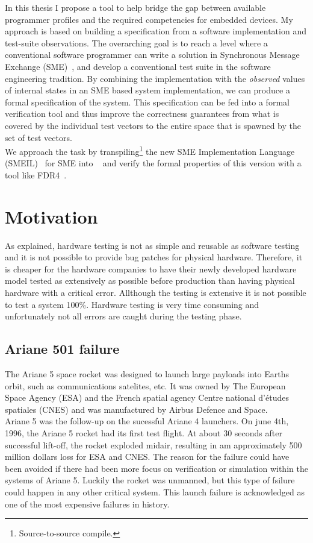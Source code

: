 In this thesis I propose a tool to help bridge the gap between available programmer profiles and the required competencies for embedded devices. My approach is based on building a specification from a software implementation and test-suite observations. The overarching goal is to reach a level where a conventional software programmer can write a solution in Synchronous Message Exchange (SME)~\cite{Vinter2014, Vinter2015, Skovhede}, and develop a conventional test suite in the software engineering tradition. By combining the implementation with the \emph{observed} values of internal states in an SME based system implementation, we can produce a formal specification of the system. This specification can be fed into a formal verification tool and thus improve the correctness guarantees from what is covered by the individual test vectors to the entire space that is spawned by the set of test vectors.\\

We approach the task by transpiling\footnote{Source-to-source compile.} the new SME Implementation Language (SMEIL)~\cite{smeil} for SME into \cspm{}~\cite{Scattergood1998} and verify the formal properties of this version with a tool like FDR4~\cite{fdr}.
\section{Motivation}
As explained, hardware testing is not as simple and reusable as software testing and it is not possible to provide bug patches for physical hardware. Therefore, it is cheaper for the hardware companies to have their newly developed hardware model tested as extensively as possible before production than having physical hardware with a critical error. Allthough the testing is extensive it is not possible to test a system 100\%. Hardware testing is very time consuming and unfortunately not all errors are caught during the testing phase.
\subsection{Ariane 501 failure}
The Ariane 5 space rocket\cite{InquiryBoard1996} was designed to launch large payloads into Earths orbit, such as communications satelites, etc. It was owned by The European Space Agency (ESA) and the French spatial agency Centre national d'\'etudes spatiales (CNES) and was manufactured by Airbus Defence and Space.\\

Ariane 5 was the follow-up on the sucessful Ariane 4 launchers. On june 4th, 1996, the Ariane 5 rocket had its first test flight. At about 30 seconds after successful lift-off, the rocket exploded midair, resulting in am approximately 500 million dollars loss for ESA and CNES. The reason for the failure could have been avoided if there had been more focus on verification or simulation within the systems of Ariane 5. Luckily the rocket was unmanned, but this type of fsilure could happen in any other critical system. This launch failure is acknowledged as one of the most expensive failures in history. \\

